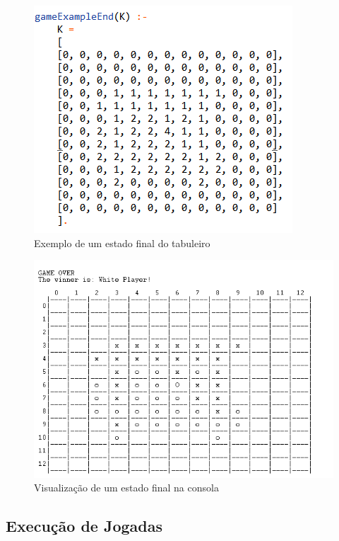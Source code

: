 \documentclass[a4paper]{article}
\begin{document}
\begin{figure}
\begin{center}
\includegraphics[scale=0.8]{gameend.png}
\caption{Exemplo de um estado final do tabuleiro}
\end{center}
\end{figure}

\begin{figure}
\begin{center}
\hspace*{-0.1cm}\includegraphics[scale=0.8]{gameendboard.png}
\caption{Visualização de um estado final na consola}
\end{center}
\end{figure}

\newpage

\subsection{Execução de Jogadas}
\end{document}
